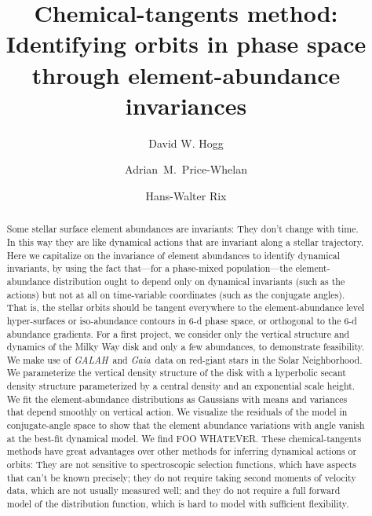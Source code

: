 \documentclass[modern]{aastex62}
\newcommand{\acronym}[1]{{\small{#1}}}
\newcommand{\project}[1]{\textsl{#1}}
\newcommand{\galah}{\project{\acronym{GALAH}}}
\newcommand{\gaia}{\project{Gaia}}
\begin{document}
\sloppy\sloppypar\raggedbottom\frenchspacing %
\graphicspath{ {figures/} }

\title{\textbf{%
Chemical-tangents method:\\
Identifying orbits in phase space through element-abundance invariances}}

\author[0000-0003-2866-9403]{David W. Hogg}

\author[0000-0003-0872-7098]{Adrian~M.~Price-Whelan}

\author[0000-0003-4996-9069]{Hans-Walter Rix}

\begin{abstract}\noindent
Some stellar surface element abundances are invariants: They don't change with time.
In this way they are like dynamical actions that are invariant along a stellar trajectory.
Here we capitalize on the invariance of element abundances to identify dynamical
invariants, by using the fact that---for a phase-mixed population---the element-abundance
distribution ought to depend only on dynamical invariants (such as the actions)
but not at all on time-variable coordinates (such as the conjugate angles).
That is, the stellar orbits should be tangent everywhere to the
element-abundance level hyper-surfaces or iso-abundance contours in 6-d phase
space, or orthogonal to the 6-d abundance gradients.
For a first project, we consider only the vertical structure and dynamics of the Milky Way
disk and only a few abundances, to demonstrate feasibility.
We make use of \galah\ and \gaia\ data on red-giant stars in the Solar Neighborhood.
We parameterize the vertical density structure of the disk with a hyperbolic secant density
structure parameterized by a central density and an
exponential scale height.
We fit the element-abundance distributions as Gaussians with means and variances that depend
smoothly on vertical action.
We visualize the residuals of the model in conjugate-angle space to show that the element abundance
variations with angle vanish at the best-fit dynamical model.
We find FOO WHATEVER.
These chemical-tangents methods have great advantages over other methods
for inferring dynamical actions or orbits: They are not sensitive to spectroscopic
selection functions, which have aspects that can't be known precisely; they
do not require taking second moments of velocity data, which are not usually measured
well; and they do not require a full forward model of the distribution function,
which is hard to model with sufficient flexibility.
\end{abstract}
\end{document}
